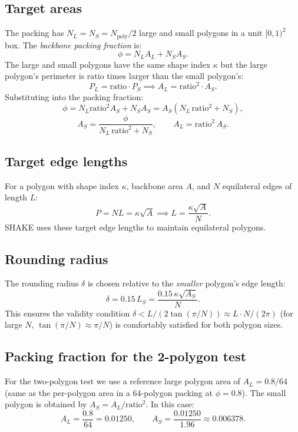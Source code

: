 \documentclass[12pt]{article}
\begin{document}
\subsection{Target areas}

The packing has $N_L = N_S = N_{\mathrm{poly}}/2$ large and small polygons in a unit
$[0,1)^2$ box.  The \emph{backbone packing fraction} is:
\[
  \phi = N_L A_L + N_S A_S.
\]
The large and small polygons have the same shape index $\kappa$ but the large polygon's
perimeter is $\mathrm{ratio}$ times larger than the small polygon's:
\[
  P_L = \mathrm{ratio}\cdot P_S \implies A_L = \mathrm{ratio}^2 \cdot A_S.
\]
Substituting into the packing fraction:
\[
  \phi = N_L \mathrm{ratio}^2 A_S + N_S A_S = A_S(N_L\,\mathrm{ratio}^2 + N_S),
\]
\[
  \boxed{A_S = \frac{\phi}{N_L\,\mathrm{ratio}^2 + N_S}, \qquad A_L = \mathrm{ratio}^2\,A_S.}
\]

\subsection{Target edge lengths}

For a polygon with shape index $\kappa$, backbone area $A$, and $N$ equilateral edges
of length $L$:
\[
  P = N L = \kappa\sqrt{A} \implies L = \frac{\kappa\sqrt{A}}{N}.
\]
SHAKE uses these target edge lengths to maintain equilateral polygons.

\subsection{Rounding radius}

The rounding radius $\delta$ is chosen relative to the \emph{smaller} polygon's edge length:
\[
  \delta = 0.15\,L_S = \frac{0.15\,\kappa\sqrt{A_S}}{N}.
\]
This ensures the validity condition $\delta < L/(2\tan(\pi/N)) \approx L\cdot N/(2\pi)$
(for large $N$, $\tan(\pi/N) \approx \pi/N$) is comfortably satisfied for both polygon sizes.

\subsection{Packing fraction for the 2-polygon test}

For the two-polygon test we use a reference large polygon area of $A_L = 0.8/64$ (same
as the per-polygon area in a 64-polygon packing at $\phi = 0.8$).  The small polygon
is obtained by $A_S = A_L / \mathrm{ratio}^2$.  In this case:
\[
  A_L = \frac{0.8}{64} = 0.01250, \qquad A_S = \frac{0.01250}{1.96} \approx 0.006378.
\]
\end{document}
